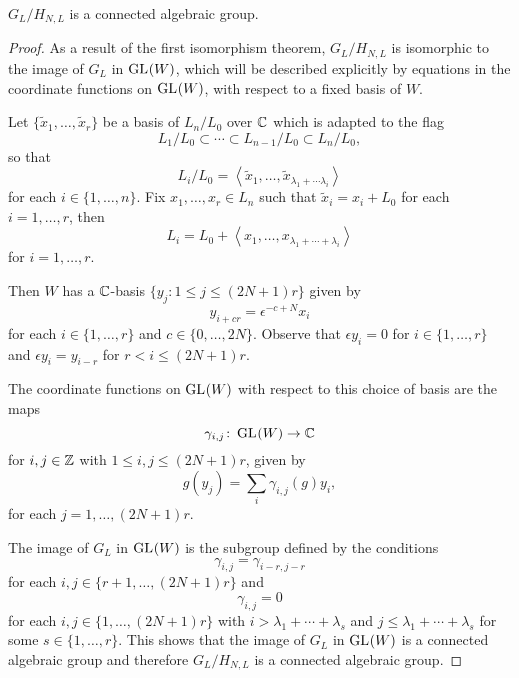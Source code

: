 \documentclass[a4paper, 11pt, twoside]{report}
\begin{document}
\begin{lemma}\label{lemma:connected-algebraic-group}
$G_L/{H_{N,L}}$ is a connected algebraic group.
\end{lemma}

\begin{proof}
As a result of the first isomorphism theorem, $G_L/{H_{N,L}}$ is isomorphic to the image of $G_L$ in $\operatorname{GL}_{}(W)$, which will be described explicitly by equations in the coordinate functions on $\operatorname{GL}_{}(W)$, with respect to a fixed basis of $W$.

Let $\{\tilde{x}_1,\ldots,\tilde{x}_r\}$ be a basis of $L_n/{L_0}$ over $\mathbb{C}$ which is adapted to the flag
\begin{equation*}
L_1/{L_0}\subset\cdots\subset L_{n-1}/{L_0}\subset L_n/{L_0},
\end{equation*}
so that
\begin{equation*}
L_i/{L_0} = \left\langle \tilde{x}_1,\ldots,\tilde{x}_{\lambda_1+\cdots\lambda_i}\right\rangle
\end{equation*}
for each $i\in\{1,\ldots,n\}$. Fix $x_1,\ldots,x_r\in L_n$ such that $\tilde{x}_i=x_i+L_0$ for each $i=1,\ldots,r$, then
\begin{equation*}
L_i = L_0 + \left\langle x_1,\ldots,x_{\lambda_1+\cdots +\lambda_i}\right\rangle
\end{equation*}
for $i=1,\ldots,r$.

Then $W$ has a $\mathbb{C}$-basis $\{y_j:1\le j\le (2N+1)r\}$ given by
\begin{equation*}
y_{i+cr} = \epsilon^{-c+N}x_i
\end{equation*}
for each $i\in\{1,\ldots,r\}$ and $c\in\{0,\ldots,2N\}$. Observe that $\epsilon y_i = 0$ for $i\in\{1,\ldots,r\}$ and $\epsilon y_i = y_{i-r}$ for $r<i\le (2N+1)r$.

The coordinate functions on $\operatorname{GL}_{}(W)$ with respect to this choice of basis are
the maps
\begin{equation*}
\gamma_{i,j}\colon\operatorname{GL}_{}(W)\to\mathbb{C}
\end{equation*}
for $i,j\in\mathbb{Z}$ with $1\le i,j\le (2N+1)r$, given by
\begin{equation*}
g(y_j) = \sum_i \gamma_{i,j}(g)y_i,
\end{equation*}
for each $j=1,\ldots,(2N+1)r$.

The image of $G_L$ in $\operatorname{GL}_{}(W)$ is the subgroup defined by the conditions
\begin{equation*}
\gamma_{i,j} = \gamma_{i-r,j-r}
\end{equation*}
for each $i,j\in\{r+1,\ldots, (2N+1)r\}$ and
\begin{equation*}
\gamma_{i,j} = 0
\end{equation*}
for each $i,j\in\{1,\ldots,(2N+1)r\}$ with $i>\lambda_1+\cdots +\lambda_s$ and $j\le \lambda_1+\cdots +\lambda_s$ for some $s\in\{1,\ldots,r\}$. This shows that the image of $G_L$ in $\operatorname{GL}_{}(W)$ is a connected algebraic group and therefore $G_L/{H_{N,L}}$ is a connected algebraic group.


\end{proof}
\end{document}
